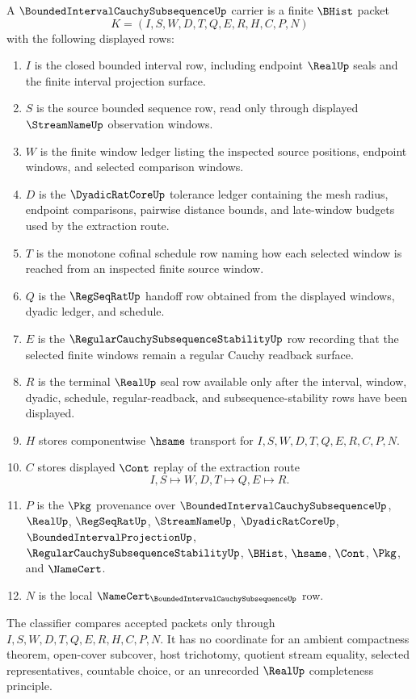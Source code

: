 \begin{definition}
\label{def:bounded-interval-cauchy-subsequence-carrier}
A $\BoundedIntervalCauchySubsequenceUp$ carrier is a finite $\BHist$ packet
$$
K=(I,S,W,D,T,Q,E,R,H,C,P,N)
$$
with the following displayed rows:
\begin{enumerate}
\item $I$ is the closed bounded interval row, including endpoint $\RealUp$ seals and the finite interval projection surface.
\item $S$ is the source bounded sequence row, read only through displayed $\StreamNameUp$ observation windows.
\item $W$ is the finite window ledger listing the inspected source positions, endpoint windows, and selected comparison windows.
\item $D$ is the $\DyadicRatCoreUp$ tolerance ledger containing the mesh radius, endpoint comparisons, pairwise distance bounds, and late-window budgets used by the extraction route.
\item $T$ is the monotone cofinal schedule row naming how each selected window is reached from an inspected finite source window.
\item $Q$ is the $\RegSeqRatUp$ handoff row obtained from the displayed windows, dyadic ledger, and schedule.
\item $E$ is the $\RegularCauchySubsequenceStabilityUp$ row recording that the selected finite windows remain a regular Cauchy readback surface.
\item $R$ is the terminal $\RealUp$ seal row available only after the interval, window, dyadic, schedule, regular-readback, and subsequence-stability rows have been displayed.
\item $H$ stores componentwise $\hsame$ transport for $I,S,W,D,T,Q,E,R,C,P,N$.
\item $C$ stores displayed $\Cont$ replay of the extraction route
$$
I,S \longmapsto W,D,T \longmapsto Q,E \longmapsto R .
$$
\item $P$ is the $\Pkg$ provenance over $\BoundedIntervalCauchySubsequenceUp$, $\RealUp$, $\RegSeqRatUp$, $\StreamNameUp$, $\DyadicRatCoreUp$, $\BoundedIntervalProjectionUp$, $\RegularCauchySubsequenceStabilityUp$, $\BHist$, $\hsame$, $\Cont$, $\Pkg$, and $\NameCert$.
\item $N$ is the local $\NameCert_{\BoundedIntervalCauchySubsequenceUp}$ row.
\end{enumerate}
The classifier compares accepted packets only through $I,S,W,D,T,Q,E,R,H,C,P,N$. It has no coordinate for an ambient compactness theorem, open-cover subcover, host trichotomy, quotient stream equality, selected representatives, countable choice, or an unrecorded $\RealUp$ completeness principle.
\end{definition}

